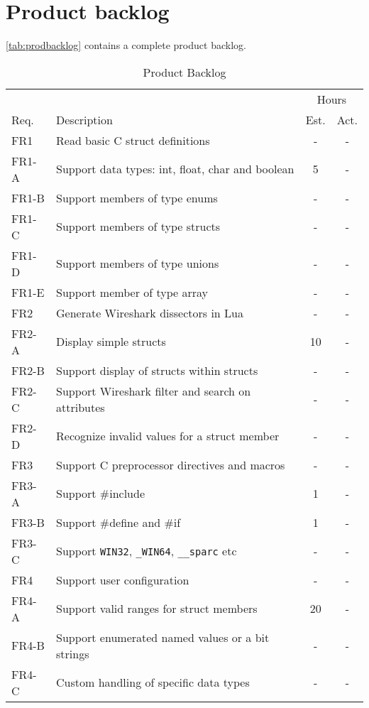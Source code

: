 \section{Product backlog}
\label{sec:prodbacklog}
\autoref{tab:prodbacklog} contains a complete product backlog.

\begin{table}[ht] \small \center
\caption{Product Backlog \label{tab:prodbacklog}}
\begin{tabularx}{\textwidth}{l X c c}
	\toprule
	& & \multicolumn{2}{c}{Hours} \\
	\cmidrule(r){3-4}
	Req. & Description & Est. & Act. \\
	\midrule
	FR1 & Read basic C struct definitions & - & - \\
	FR1-A & Support data types: int, float, char and boolean & 5 & - \\
	FR1-B & Support members of type enums & - & - \\
	FR1-C & Support members of type structs & - & - \\
	FR1-D & Support members of type unions & - & - \\
	FR1-E & Support member of type array & - & - \\
	\addlinespace
	FR2 & Generate Wireshark dissectors in Lua & - & - \\
	FR2-A & Display simple structs & 10 & - \\
	FR2-B & Support display of structs within structs & - & - \\
	FR2-C & Support Wireshark filter and search on attributes & - & - \\
	FR2-D & Recognize invalid values for a struct member & - & - \\
	\addlinespace
	FR3 & Support C preprocessor directives and macros & - & - \\
	FR3-A & Support \#include & 1 & - \\
	FR3-B & Support \#define and \#if & 1 & - \\
	FR3-C & Support \verb+WIN32+, \verb+_WIN64+, \verb+__sparc+ etc & - & - \\
	\addlinespace
	FR4 & Support user configuration & - & - \\
	FR4-A & Support valid ranges for struct members & 20 & - \\
	FR4-B & Support enumerated named values or a bit strings & - & - \\
	FR4-C & Custom handling of specific data types & - & - \\

\end{tabularx}
\end{table}
